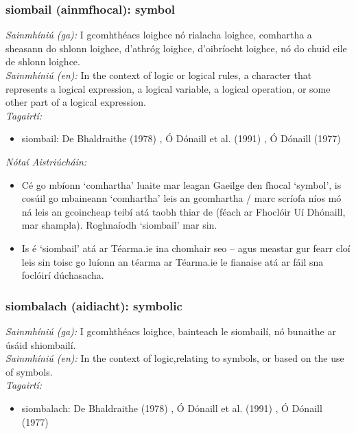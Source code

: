 \documentclass{article}
\begin{document}
\subsubsection*{siombail (ainmfhocal): symbol}
 \noindent \textit{Sainmhíniú (ga):} I gcomhthéacs loighce nó rialacha loighce, comhartha a sheasann do shlonn loighce, d'athróg loighce, d'oibríocht loighce, nó do chuid eile de shlonn loighce.
\\
 \noindent \textit{Sainmhíniú (en):} In the context of logic or logical rules, a character that represents a logical expression, a logical variable, a logical operation, or some other part of a logical expression.
\\
 \noindent \textit{Tagairtí:}
\begin{itemize}
	\item siombail: De Bhaldraithe (1978) \cite{de-bhaldraithe}, Ó Dónaill et al. (1991) \cite{focloir-beag}, Ó Dónaill (1977) \cite{odonaill}
\end{itemize}

 \noindent \textit{Nótaí Aistriúcháin:}
\begin{itemize}
	\item Cé go mbíonn `comhartha' luaite mar leagan Gaeilge den fhocal `symbol', is cosúil go mbaineann `comhartha' leis an gcomhartha / marc scríofa níos mó ná leis an gcoincheap teibí atá taobh thiar de (féach ar Fhoclóir Uí Dhónaill, mar shampla). Roghnaíodh `siombail' mar sin.
	\item Is é `siombail' atá ar Téarma.ie ina chomhair seo -- agus meastar gur fearr cloí leis sin toisc go luíonn an téarma ar Téarma.ie le fianaise atá ar fáil sna foclóirí dúchasacha.
\end{itemize}


\subsubsection*{siombalach (aidiacht): symbolic}
 \noindent \textit{Sainmhíniú (ga):} I gcomhthéacs loighce, bainteach le siombailí, nó bunaithe ar úsáid shiombailí.
\\
 \noindent \textit{Sainmhíniú (en):} In the context of logic,relating to symbols, or based on the use of symbols.
\\
 \noindent \textit{Tagairtí:}
\begin{itemize}
	\item siombalach: De Bhaldraithe (1978) \cite{de-bhaldraithe}, Ó Dónaill et al. (1991) \cite{focloir-beag}, Ó Dónaill (1977) \cite{odonaill}
\end{itemize}
\end{document}
